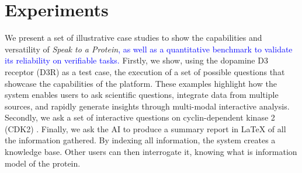 \documentclass{article}
\newcommand{\new}[1]{\textcolor{blue}{#1}}
\newcommand{\new}[1]{#1}
\begin{document}


\section{Experiments}\label{sec:cases}
We present a set of illustrative case studies to show the capabilities and versatility of \emph{Speak to a Protein}\new{, as well as a quantitative benchmark to validate its reliability on verifiable tasks.}
Firstly, we show, using the dopamine D3 receptor (D3R) \citep{chien2010structure} as a test case, the execution of a set of possible questions that showcase the capabilities of the platform. These examples highlight how the system enables users to ask scientific questions, integrate data from multiple sources, and rapidly generate insights through multi-modal interactive analysis. 
Secondly, we ask a set of interactive questions on cyclin-dependent kinase 2 (CDK2) \citep{Malumbres2009}. Finally, we ask the AI to produce a summary report in LaTeX of all the information gathered. 
By indexing all information, the system creates a knowledge base. Other users can then interrogate it, knowing what is information model of the protein.
\end{document}
